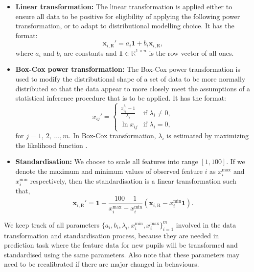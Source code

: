 \begin{itemize}
\item \textbf{Linear transformation:} The linear transformation is applied either to ensure all data to be positive for eligibility of applying the following power transformation, or to adapt to distributional modelling choice. It has the format:
\begin{equation}
\mathbf{x}_{i,\text{R}}' = a_i \mathbf{1} + b_i \mathbf{x}_{i,\text{R}},
\label{eq:linearTransformation}
\end{equation}
where $a_i$ and $b_i$ are constants and $\mathbf{1} \in \mathbb{R}^{1 \times n}$ is the row vector of all ones.
\item \textbf{Box-Cox power transformation:} The Box-Cox power transformation is used to modify the distributional shape of a set of data to be more normally distributed so that the data appear to more closely meet the assumptions of a statistical inference procedure that is to be applied. It has the format:
\begin{equation}
x_{ij}' = 
\begin{cases}
\frac{x_{ij}^{\lambda_i}-1}{\lambda_i} & \text{if } \lambda_i \neq 0, \\
\ln{x_{ij}} & \text{if } \lambda_i = 0,
\end{cases}
\end{equation}
for $j = 1, ~2, ~\dots, m$. In Box-Cox transformation, $\lambda_i$ is estimated by maximizing the likelihood function \cite{Box64ananalysis}.
\item \textbf{Standardisation:} We choose to scale all features into range $[1, 100]$. If we denote the maximum and minimum values of observed feature $i$ as $x_i^\text{max}$ and $x_i^\text{min}$ respectively, then the standardisation is a linear transformation such that,
\begin{equation}
\mathbf{x}_{i,\text{R}}' = \mathbf{1} + \frac{100-1}{x_i^\text{max}-x_i^\text{min}} \left( \mathbf{x}_{i,\text{R}} - x_i^\text{min} \mathbf{1} \right).
\end{equation}
\end{itemize}

We keep track of all parameters $\{ a_i, b_i, \lambda_i, x_i^\text{min}, x_i^\text{max}\}_{i=1}^m$ involved in the data transformation and standardisation process, because they are needed in prediction task where the feature data for new pupils will be transformed and standardised using the same parameters. Also note that these parameters may need to be recalibrated if there are major changed in behaviours.